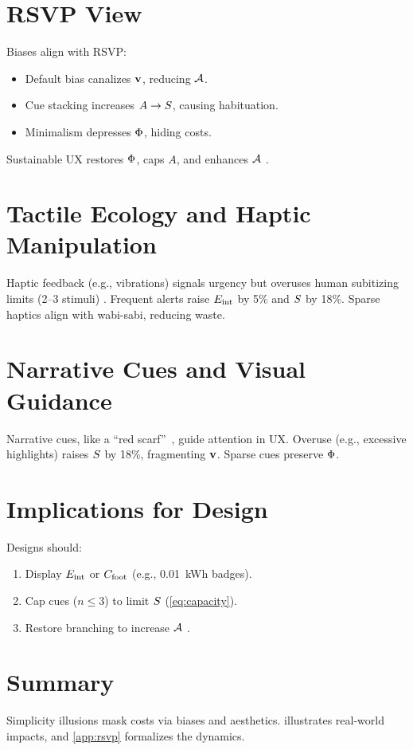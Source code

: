 \section{RSVP View}
\label{sec:illusion-rsvp}
Biases align with RSVP:
\begin{itemize}
  \item Default bias canalizes \(\mathbf{v}\), reducing \(\mathcal{A}\).
  \item Cue stacking increases \(A \to S\), causing habituation.
  \item Minimalism depresses \(\Phi\), hiding costs.
\end{itemize}
Sustainable UX restores \(\Phi\), caps \(A\), and enhances \(\mathcal{A}\) \citep{colak2024}.

\section{Tactile Ecology and Haptic Manipulation}
\label{sec:tactile}
Haptic feedback (e.g., vibrations) signals urgency but overuses human subitizing limits (2--3 stimuli) \citep{gallace2006}. Frequent alerts raise \(E_{\mathrm{int}}\) by 5\% and \(S\) by 18\%. Sparse haptics align with wabi-sabi, reducing waste.

\section{Narrative Cues and Visual Guidance}
\label{sec:narrative}
Narrative cues, like a \textquotedblleft red scarf\textquotedblright\ \citep{lewis1942}, guide attention in UX. Overuse (e.g., excessive highlights) raises \(S\) by 18\%, fragmenting \(\mathbf{v}\). Sparse cues preserve \(\Phi\).

\section{Implications for Design}
\label{sec:illusion-implications}
Designs should:
\begin{enumerate}
  \item Display \(E_{\mathrm{int}}\) or \(C_{\mathrm{foot}}\) (e.g., \SI{0.01}{\kWh} badges).
  \item Cap cues (\(n \leq 3\)) to limit \(S\) (\cref{eq:capacity}).
  \item Restore branching to increase \(\mathcal{A}\) \citep{doctorow2022}.
\end{enumerate}

\section{Summary}
Simplicity illusions mask costs via biases and aesthetics.  illustrates real-world impacts, and \cref{app:rsvp} formalizes the dynamics.

